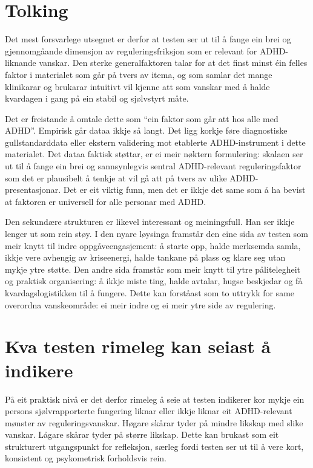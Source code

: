 \documentclass[11pt,a4paper]{article}
\begin{document}
\section{Tolking}
Det mest forsvarlege utsegnet er derfor at testen ser ut til å fange ein brei og gjennomgåande dimensjon av reguleringsfriksjon som er relevant for ADHD-liknande vanskar. Den sterke generalfaktoren talar for at det finst minst éin felles faktor i materialet som går på tvers av itema, og som samlar det mange klinikarar og brukarar intuitivt vil kjenne att som vanskar med å halde kvardagen i gang på ein stabil og sjølvstyrt måte.

Det er freistande å omtale dette som ``ein faktor som går att hos alle med ADHD''. Empirisk går dataa ikkje så langt. Det ligg korkje føre diagnostiske gullstandarddata eller ekstern validering mot etablerte ADHD-instrument i dette materialet. Det dataa faktisk støttar, er ei meir nøktern formulering: skalaen ser ut til å fange ein brei og sannsynlegvis sentral ADHD-relevant reguleringsfaktor som det er plausibelt å tenkje at vil gå att på tvers av ulike ADHD-presentasjonar. Det er eit viktig funn, men det er ikkje det same som å ha bevist at faktoren er universell for alle personar med ADHD.

Den sekundære strukturen er likevel interessant og meiningsfull. Han ser ikkje lenger ut som rein støy. I den nyare løysinga framstår den eine sida av testen som meir knytt til indre oppgåveengasjement: å starte opp, halde merksemda samla, ikkje vere avhengig av kriseenergi, halde tankane på plass og klare seg utan mykje ytre støtte. Den andre sida framstår som meir knytt til ytre pålitelegheit og praktisk organisering: å ikkje miste ting, halde avtalar, hugse beskjedar og få kvardagslogistikken til å fungere. Dette kan forståast som to uttrykk for same overordna vanskeområde: ei meir indre og ei meir ytre side av regulering.

\section{Kva testen rimeleg kan seiast å indikere}
På eit praktisk nivå er det derfor rimeleg å seie at testen indikerer kor mykje ein persons sjølvrapporterte fungering liknar eller ikkje liknar eit ADHD-relevant mønster av reguleringsvanskar. Høgare skårar tyder på mindre likskap med slike vanskar. Lågare skårar tyder på større likskap. Dette kan brukast som eit strukturert utgangspunkt for refleksjon, særleg fordi testen ser ut til å vere kort, konsistent og psykometrisk forholdsvis rein.
\end{document}

